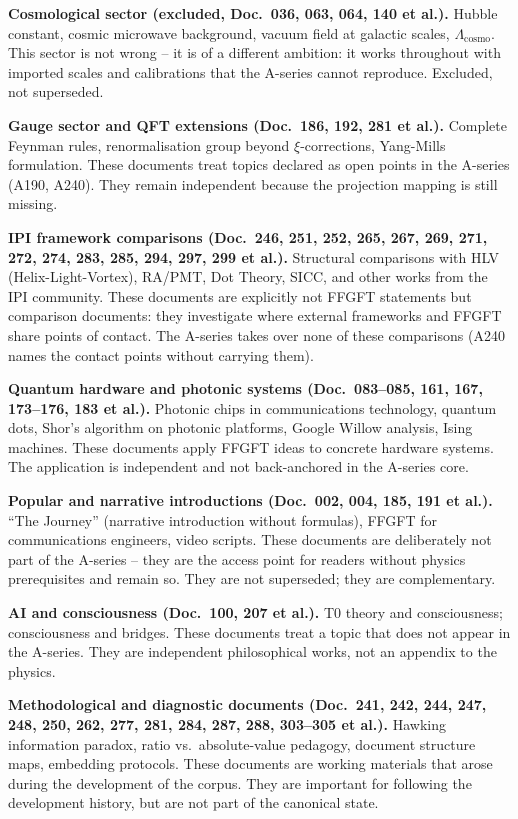\textbf{Cosmological sector (excluded, Doc.~036, 063, 064, 140 et al.).}
Hubble constant, cosmic microwave background, vacuum field at galactic scales,
$\Lambda_\text{cosmo}$. This sector is not wrong -- it is of a different ambition:
it works throughout with imported scales and calibrations that the A-series cannot
reproduce. Excluded, not superseded.

\textbf{Gauge sector and QFT extensions (Doc.~186, 192, 281 et al.).}
Complete Feynman rules, renormalisation group beyond $\xi$-corrections, Yang-Mills
formulation. These documents treat topics declared as open points in the A-series
(A190, A240). They remain independent because the projection mapping is still missing.

\textbf{IPI framework comparisons (Doc.~246, 251, 252, 265, 267, 269, 271, 272,
274, 283, 285, 294, 297, 299 et al.).} Structural comparisons with HLV
(Helix-Light-Vortex), RA/PMT, Dot Theory, SICC, and other works from the IPI
community. These documents are explicitly not FFGFT statements but comparison
documents: they investigate where external frameworks and FFGFT share points of
contact. The A-series takes over none of these comparisons (A240 names the contact
points without carrying them).

\textbf{Quantum hardware and photonic systems (Doc.~083--085, 161, 167,
173--176, 183 et al.).} Photonic chips in communications technology, quantum dots,
Shor's algorithm on photonic platforms, Google Willow analysis, Ising machines.
These documents apply FFGFT ideas to concrete hardware systems. The application is
independent and not back-anchored in the A-series core.

\textbf{Popular and narrative introductions (Doc.~002, 004, 185, 191 et al.).}
``The Journey'' (narrative introduction without formulas), FFGFT for communications
engineers, video scripts. These documents are deliberately not part of the A-series
-- they are the access point for readers without physics prerequisites and remain
so. They are not superseded; they are complementary.

\textbf{AI and consciousness (Doc.~100, 207 et al.).} T0 theory and consciousness;
consciousness and bridges. These documents treat a topic that does not appear in
the A-series. They are independent philosophical works, not an appendix to the
physics.

\textbf{Methodological and diagnostic documents (Doc.~241, 242, 244, 247, 248,
250, 262, 277, 281, 284, 287, 288, 303--305 et al.).} Hawking information paradox,
ratio vs.\ absolute-value pedagogy, document structure maps, embedding protocols.
These documents are working materials that arose during the development of the
corpus. They are important for following the development history, but are not part
of the canonical state.

